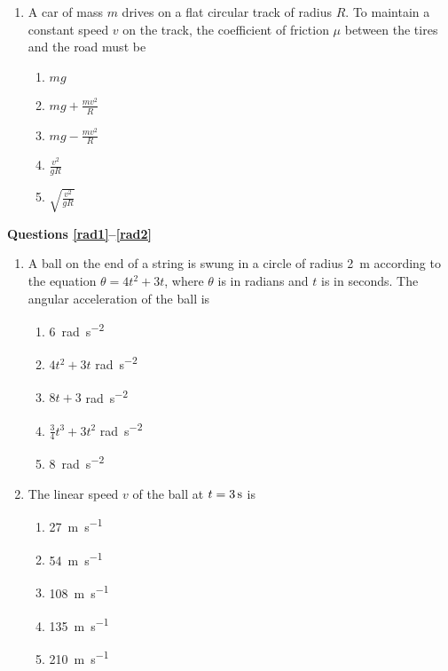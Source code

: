 \documentclass{../../../oss-classkick}
\begin{document}
\begin{multicols*}{2}
\begin{enumerate}[leftmargin=18pt,resume]
  \item A car of mass $m$ drives on a flat circular track of radius $R$. To
    maintain a constant speed $v$ on the track, the coefficient of friction
    $\mu$ between the tires and the road must be
    \begin{enumerate}[nosep,leftmargin=18pt,label=(\Alph*)]
    \item $\displaystyle mg$
    \item $\displaystyle mg+\frac{mv^2}{R}$
    \item $\displaystyle mg-\frac{mv^2}{R}$
    \item $\displaystyle \frac{v^2}{gR}$
    \item $\displaystyle \sqrt{\frac{v^2}{gR}}$
    \end{enumerate}
  \end{enumerate}
  \textbf{Questions \ref{rad1}--\ref{rad2}}
  \begin{enumerate}[leftmargin=18pt,resume]
  \item A ball on the end of a string is swung in a circle of radius
    \SI{2}{\metre} according to the equation $\theta = 4t^2+3t$, where $\theta$
    is in radians and $t$ is in seconds. The angular acceleration of the ball
    is
    \begin{enumerate}[nosep,leftmargin=18pt,label=(\Alph*)]
    \item\SI{6}{rad\per\second\squared}
    \item $4t^2 + 3t$ \si{rad\per\second\squared}
    \item $8t +3$ \si{rad\per\second\squared}
    \item $\displaystyle\frac{3}{4} t^3 + 3t^2$ \si{rad\per\second\squared}
    \item \SI{8}{rad\per\second\squared}
    \end{enumerate}
    \label{rad1}
    
  \item The linear speed $v$ of the ball at $t=\SI3\second$ is
    \begin{enumerate}[nosep,leftmargin=18pt,label=(\Alph*)]
    \item\SI{27 }{\metre\per\second}
    \item\SI{54 }{\metre\per\second}
    \item\SI{108}{\metre\per\second}
    \item\SI{135}{\metre\per\second}
    \item\SI{210}{\metre\per\second}
    \end{enumerate}
    \label{rad2}
    

\end{enumerate}
\end{multicols*}
\end{document}
